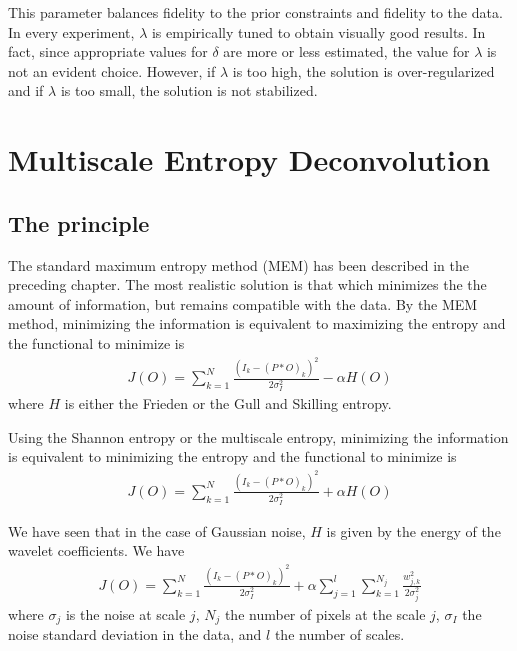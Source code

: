 This parameter balances fidelity to the prior constraints and fidelity to the
data. In every experiment, $\lambda$ is empirically tuned to obtain 
visually good results. In fact, since appropriate values for $\delta$ are more or
less estimated, the value for $\lambda$ is not an evident choice.
However, if $\lambda$ is too high, the solution is over-regularized and if
$\lambda$ is too small, the solution is not stabilized.


\clearpage
\newpage

\section{Multiscale Entropy Deconvolution}
\subsection{The principle}
The standard maximum entropy method (MEM) has been described in the preceding
chapter. The most realistic solution is that which minimizes 
the the amount of information,
but remains compatible with the data. 
By the MEM method, minimizing the information
is equivalent to maximizing the entropy and the   functional to minimize is 
\begin{eqnarray}
J(O)= 
\sum_{k=1}^N
 \frac{(I_k-(P*O)_k)^2}{2\sigma_I^2} - \alpha H(O)
\end{eqnarray}
where $H$ is either the Frieden or the Gull and Skilling entropy. 

Using the Shannon entropy or the multiscale entropy, minimizing the information
is equivalent to  minimizing 
the entropy and the functional to minimize is 
\begin{eqnarray}
J(O)= \sum_{k=1}^N \frac{(I_k-(P*O)_k)^2}{2\sigma_I^2} + \alpha H(O)
\end{eqnarray}

We have seen that in the case of Gaussian noise, $H$ is given by the 
energy of the wavelet coefficients. We have
\begin{eqnarray}
J(O)= \sum_{k=1}^N
 \frac{(I_k-(P*O)_k)^2}{2\sigma_I^2} + \alpha \sum_{j=1}^{l} \sum_{k=1}^{N_j} \frac{w_{j,k}^2}{2 \sigma_j^2}
\end{eqnarray}
where $\sigma_j$ is the noise at scale $j$, $N_j$ the number of pixels at the
scale $j$, $\sigma_I$ the noise standard deviation in the data, and $l$ the number
of scales.

